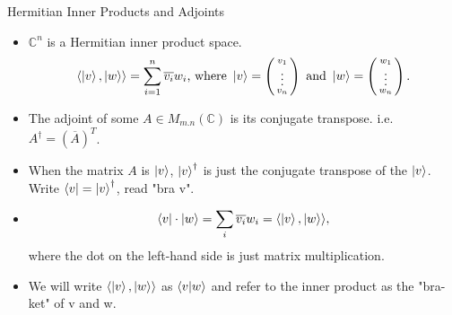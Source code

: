 \documentclass[handout, 10 pt]{beamer}
\newcommand{\icol}[1]{%
  \left(\begin{smallmatrix}#1\end{smallmatrix}\right)%
}
\begin{document}
\begin{frame}{Hermitian Inner Products and Adjoints}
\begin{itemize}
\item
$\mathbb{C}^n$ is a Hermitian inner product space.
\begin{equation} \label{inner product defn}
  \langle \ket{v},\ket{w}\rangle=\sum\limits_{i=1}^n \overline{v_i} w_i \textrm{, where }
  \ket{v}=\icol{v_1\\ \vdots\\v_n} \textrm{ and }\ket{w}=\icol{w_1\\ \vdots\\w_n}.
\end{equation}
\pause
    \item The adjoint of some $A \in M_{m.n}(\mathbb{C})$ is its conjugate transpose. i.e. $A^\dagger=(\overline{A})^T$.
    \pause
    \item When the matrix $A$ is $\ket{v}$, $\ket{v}^\dagger$ is just the conjugate transpose of the $\ket{v}$. Write $\bra{v}={\ket{v}}^\dagger$, read "bra v".
    \pause
    \item
    \begin{equation}
    \bra{v}\cdot \ket{w}=\sum_i \overline{v_i}w_i=\langle \ket{v},\ket{w}\rangle,
    \end{equation}
    where the dot on the left-hand side is just matrix multiplication.
    \pause
    \item We will write $\langle \ket{v},\ket{w}\rangle$ as $\braket{v|w}$ and refer to the inner product as the "bra-ket" of v and w.
\end{itemize}
\end{frame}
\end{document}
